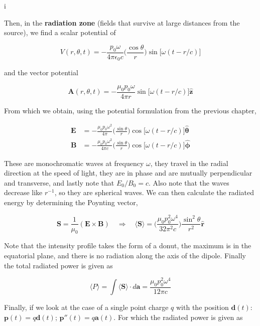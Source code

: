 i\documentclass[a4paper]{article}
\begin{document}
Then, in the \textbf{radiation zone} (fields that survive at large distances from the source), we find a scalar potential of 

\begin{equation*}
    V(r, \theta, t)=-\frac{p_0\omega}{4\pi\epsilon_0 c}\bigg(\frac{\cos\theta}{r}\bigg)\sin\big[\omega(t-r/c)\big]
\end{equation*}

and the vector potential

\begin{equation*}
    \bm{A}(r, \theta, t)=-\frac{\mu_0p_0\omega}{4\pi r}\sin\big[\omega(t-r/c)\big]\bm{\hat{z}}
\end{equation*}

From which we obtain, using the potential formulation from the previous chapter,

\begin{align*}
    \bm{E}&=-\frac{\mu_0p_0\omega^2}{4\pi}\bigg(\frac{\sin\theta}{r}\bigg)\cos\big[\omega(t-r/c)\big]\bm{\hat{\theta}}\\[1em]
    \bm{B}&=-\frac{\mu_0p_0\omega^2}{4\pi c}\bigg(\frac{\sin\theta}{r}\bigg)\cos\big[\omega(t-r/c)\big]\bm{\hat{\phi}}
\end{align*}

These are monochromatic waves at frequency $\omega$, they travel in the radial direction at the speed of light, they are in phase and are mutually perpendicular and transverse, and lastly note that $E_0/B_0=c$. Also note that the waves decrease like $r^{-1}$, so they are spherical waves. We can then calculate the radiated energy by determining the Poynting vector,

\begin{equation*}
    \bm{S}=\frac{1}{\mu_0}(\bm{E}\times\bm{B})\quad\Rightarrow\quad \langle\bm{S}\rangle=\bigg(\frac{\mu_0p_0^2\omega^4}{32\pi^2 c}\bigg)\frac{\sin^2\theta}{r^2}\hat{\bm{r}}
\end{equation*}

Note that the intensity profile takes the form of a donut, the maximum is in the equatorial plane, and there is no radiation along the axis of the dipole. Finally the total radiated power is given as

\begin{equation*}
    \langle P\rangle=\int\langle\bm{S}\rangle\cdot d\bm{a}=\frac{\mu_0p_0^2\omega^4}{12\pi c}
\end{equation*}

Finally, if we look at the case of a single point charge $q$ with the position $\bm{d}(t)$: $\bm{p}(t)=q\bm{d}(t)$; $\bm{p}''(t)=q\bm{a}(t)$. For which the radiated power is given as
\end{document}
